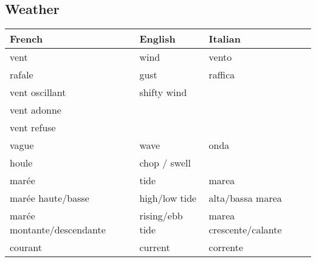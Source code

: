 \documentclass[a4paper, 12pt, twoside]{article}
\begin{document}
    \begin{indt}{\section{Weather}} %
        \begin{tabular}{|l|l|l|}
            \hline %
            \textbf{French}
            & \textbf{English}
            & \textbf{Italian}
            \\
            \hline
            \hline %
            vent %
            & wind
            & vento
            \\
            \hline %
            rafale %
            & gust
            & raffica
            \\
            \hline %
            vent oscillant %
            & shifty wind
            &
            \\
            \hline %
            vent adonne %
            &
            &
            \\
            \hline %
            vent refuse %
            &
            &
            \\
            \hline %
            vague %
            & wave
            & onda
            \\
            \hline %
            houle %
            & chop / swell
            &
            \\
            \hline %
            marée %
            & tide
            & marea
            \\
            \hline %
            marée haute/basse %
            & high/low tide
            & alta/bassa marea
            \\
            \hline %
            marée montante/descendante %
            & rising/ebb tide
            & marea crescente/calante
            \\
            \hline %
            courant %
            & current
            & corrente
            \\
            \hline %
        \end{tabular}
    \end{indt} %
\end{document}
